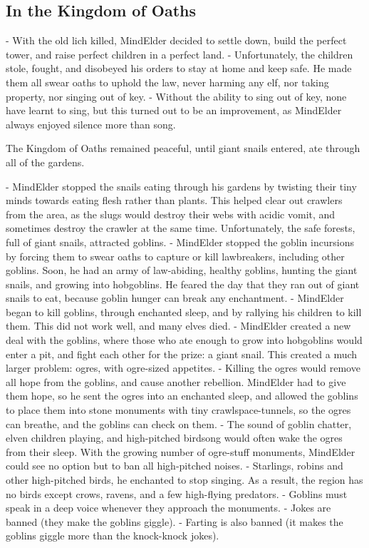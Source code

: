 \subsection{In the Kingdom of Oaths}

- With the old lich killed, \gls{MindElder} decided to settle down, build the perfect tower, and raise perfect children in a perfect land.
- Unfortunately, the children stole, fought, and disobeyed his orders to stay at home and keep safe.  He made them all swear oaths to uphold the law, never harming any elf, nor taking property, nor singing out of key.
- Without the ability to sing out of key, none have learnt to sing, but this turned out to be an improvement, as \gls{MindElder} always enjoyed silence more than song.

The Kingdom of Oaths remained peaceful, until giant snails entered, ate through all of the gardens.


- \gls{MindElder} stopped the snails eating through his gardens by twisting their tiny minds towards eating flesh rather than plants.  This helped clear out \glspl{crawler} from the area, as the slugs would destroy their webs with acidic vomit, and sometimes destroy the \gls{crawler} at the same time.  Unfortunately, the safe forests, full of giant snails, attracted goblins.
- \gls{MindElder} stopped the goblin incursions by forcing them to swear oaths to capture or kill lawbreakers, including other goblins.  Soon, he had an army of law-abiding, healthy goblins, hunting the giant snails, and growing into hobgoblins.  He feared the day that they ran out of giant snails to eat, because goblin hunger can break any enchantment.
- \gls{MindElder} began to kill goblins, through enchanted sleep, and by rallying his children to kill them.  This did not work well, and many elves died.
- \gls{MindElder} created a new deal with the goblins, where those who ate enough to grow into hobgoblins would enter a pit, and fight each other for the prize: a giant snail.  This created a much larger problem: ogres, with ogre-sized appetites.
- Killing the ogres would remove all hope from the goblins, and cause another rebellion.  \gls{MindElder} had to give them hope, so he sent the ogres into an enchanted sleep, and allowed the goblins to place them into stone monuments with tiny crawlspace-tunnels, so the ogres can breathe, and the goblins can check on them.
- The sound of goblin chatter, elven children playing, and high-pitched birdsong would often wake the ogres from their sleep.  With the growing number of ogre-stuff monuments, \gls{MindElder} could see no option but to ban all high-pitched noises.
    - Starlings, robins and other high-pitched birds, he enchanted to stop singing.  As a result, the region has no birds except crows, ravens, and a few high-flying predators.
    - Goblins must speak in a deep voice whenever they approach the monuments.
    - Jokes are banned (they make the goblins giggle).
    - Farting is also banned (it makes the goblins giggle more than the knock-knock jokes).



